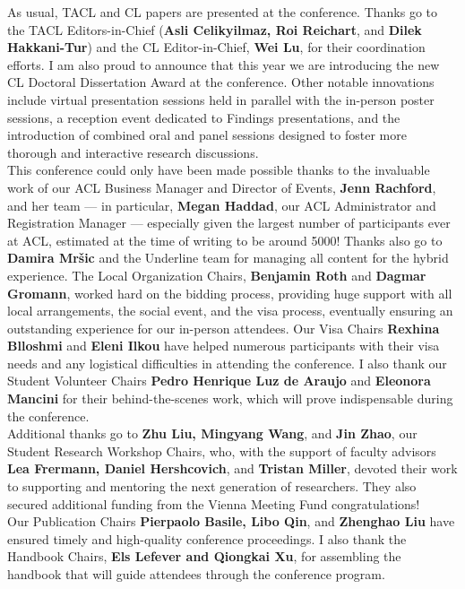 As usual, TACL and CL papers are presented at the conference. Thanks go to the TACL Editors-in-Chief (\textbf{Asli Celikyilmaz, Roi Reichart}, and \textbf{Dilek Hakkani-Tur}) and the CL Editor-in-Chief, \textbf{Wei Lu}, for their coordination efforts. I am also proud to announce that this year we are introducing the new CL Doctoral Dissertation Award at the conference. Other notable innovations include virtual presentation sessions held in parallel with the in-person poster sessions, a reception event dedicated to Findings presentations, and the introduction of combined oral and panel sessions designed to foster more thorough and interactive research discussions.\\


This conference could only have been made possible thanks to the invaluable work of our ACL Business Manager and Director of Events, \textbf{Jenn Rachford}, and her team — in particular, \textbf{Megan Haddad}, our ACL Administrator and Registration Manager — especially given the largest number of participants ever at ACL, estimated at the time of writing to be around 5000! Thanks also go to \textbf{Damira Mršic} and the Underline team for managing all content for the hybrid experience. The Local Organization Chairs, \textbf{Benjamin Roth} and \textbf{Dagmar Gromann}, worked hard on the bidding process, providing huge support with all local arrangements, the social event, and the visa process, eventually ensuring an outstanding experience for our in-person attendees. Our Visa Chairs \textemdash \textbf{Rexhina Blloshmi} and \textbf{Eleni Ilkou} \textemdash have helped numerous participants with their visa needs and any logistical difficulties in attending the conference. I also thank our Student Volunteer Chairs \textemdash \textbf{Pedro Henrique Luz de Araujo} and \textbf{Eleonora Mancini} \textemdash for their behind-the-scenes work, which will prove indispensable during the conference. \\


Additional thanks go to \textbf{Zhu Liu, Mingyang Wang}, and \textbf{Jin Zhao}, our Student Research Workshop Chairs, who, with the support of faculty advisors \textbf{Lea Frermann, Daniel Hershcovich}, and \textbf{Tristan Miller}, devoted their work to supporting and mentoring the next generation of researchers. They also secured additional funding from the Vienna Meeting Fund \textemdash congratulations!\\


Our Publication Chairs \textemdash \textbf{Pierpaolo Basile, Libo Qin}, and \textbf{Zhenghao Liu} \textemdash have ensured timely and high-quality conference proceedings. I also thank the Handbook Chairs, \textbf{Els Lefever and Qiongkai Xu}, for assembling the handbook that will guide attendees through the conference program.\\


